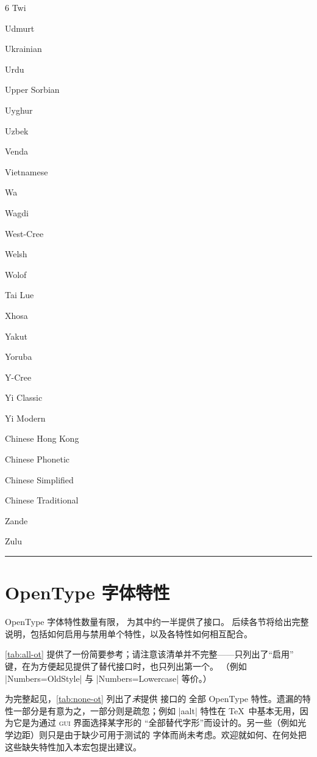 \documentclass[a4paper]{l3doc}
\begin{document}
\begin{table}[p]
\begin{minipage}{\linewidth+4cm}
\begin{multicols}{6}
    Twi \par
    Udmurt \par
    Ukrainian \par
    Urdu \par
    Upper Sorbian \par
    Uyghur \par
    Uzbek \par
    Venda \par
    Vietnamese \par
    Wa \par
    Wagdi \par
    West-Cree \par
    Welsh \par
    Wolof \par
    Tai Lue \par
    Xhosa \par
    Yakut \par
    Yoruba \par
    Y-Cree \par
    Yi Classic \par
    Yi Modern \par
    Chinese Hong Kong \par
    Chinese Phonetic \par
    Chinese Simplified \par
    Chinese Traditional \par
    Zande \par
    Zulu
  \end{multicols}
  \hspace{4pt}
  \hrule
 \end{minipage}
\end{table}


\section{OpenType 字体特性}
\label{sec:ot-feat}

OpenType 字体特性数量有限， 为其中约一半提供了接口。
后续各节将给出完整说明，包括如何启用与禁用单个特性，以及各特性如何相互配合。

\vref{tab:all-ot} 提供了一份简要参考；请注意该清单并不完整——只列出了“启用”
键，在为方便起见提供了替代接口时，也只列出第一个。
（例如 |Numbers=OldStyle| 与 |Numbers=Lowercase| 等价。）

为完整起见，\vref{tab:none-ot} 列出了\emph{未}提供  接口的
全部 OpenType 特性。遗漏的特性一部分是有意为之，一部分则是疏忽；例如 |aalt|
特性在 \TeX\ 中基本无用，因为它是为通过 \textsc{gui} 界面选择某字形的
“全部替代字形”而设计的。另一些（例如光学边距）则只是由于缺少可用于测试的
字体而尚未考虑。欢迎就如何、在何处把这些缺失特性加入本宏包提出建议。
\end{document}
